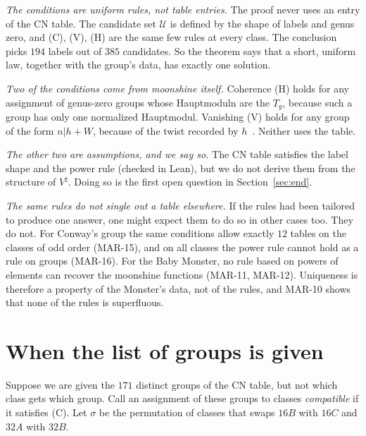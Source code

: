 \documentclass[11pt]{amsart}
\theoremstyle{definition}
\newcommand{\U}{\mathcal{U}}
\begin{document}
\emph{The conditions are uniform rules, not table entries.} The proof never uses an entry of the CN table. The candidate set $\U$ is defined by the shape of labels and genus zero, and (C), (V), (H) are the same few rules at every class. The conclusion picks $194$ labels out of $385$ candidates. So the theorem says that a short, uniform law, together with the group's data, has exactly one solution.

\emph{Two of the conditions come from moonshine itself.} Coherence (H) holds for any assignment of genus-zero groups whose Hauptmoduln are the $T_g$, because such a group has only one normalized Hauptmodul. Vanishing (V) holds for any group of the form $n|h+W$, because of the twist recorded by $h$~\cite{CN79}. Neither uses the table.

\emph{The other two are assumptions, and we say so.} The CN table satisfies the label shape and the power rule (checked in Lean), but we do not derive them from the structure of $V^\natural$. Doing so is the first open question in Section~\ref{sec:end}.

\emph{The same rules do not single out a table elsewhere.} If the rules had been tailored to produce one answer, one might expect them to do so in other cases too. They do not. For Conway's group the same conditions allow exactly $12$ tables on the classes of odd order (MAR-15), and on all classes the power rule cannot hold as a rule on groups (MAR-16). For the Baby Monster, no rule based on powers of elements can recover the moonshine functions (MAR-11, MAR-12). Uniqueness is therefore a property of the Monster's data, not of the rules, and MAR-10 shows that none of the rules is superfluous.

\section{When the list of groups is given}\label{sec:cat}
Suppose we are given the $171$ distinct groups of the CN table, but not which class gets which group. Call an assignment of these groups to classes \emph{compatible} if it satisfies (C). Let $\sigma$ be the permutation of classes that swaps $16B$ with $16C$ and $32A$ with $32B$.
\end{document}
